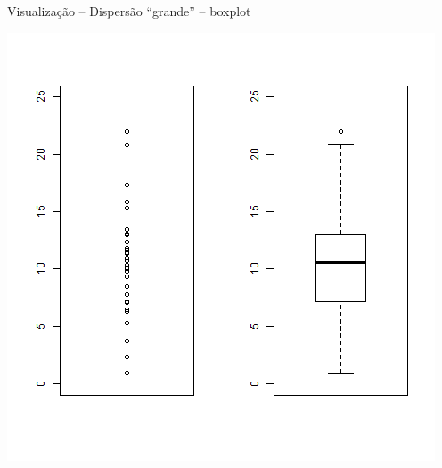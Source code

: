 \documentclass{beamer}
\begin{document}
\begin{frame}{\scriptsize Visualização -- Dispersão ``grande'' -- boxplot}
  \begin{center}
    \includegraphics[height=.8\textheight]{Cap17/dot-box-G}
  \end{center}
\end{frame}

\end{document}
